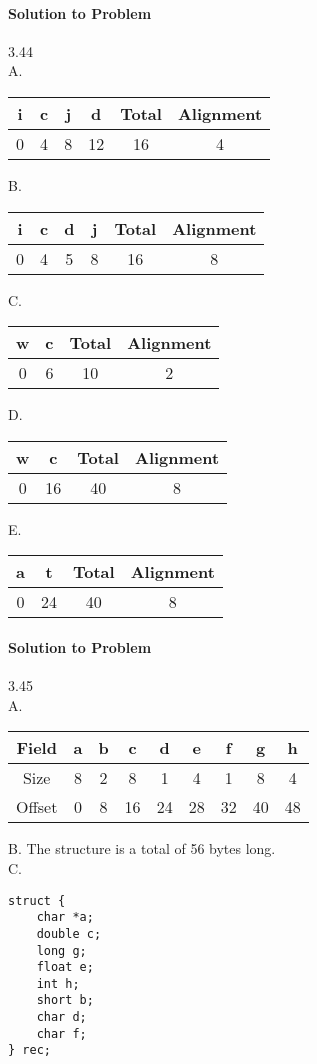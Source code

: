 \documentclass{report}
\begin{document}
\paragraph{Solution to Problem } 3.44\\
A. 
\begin{center}
\begin{tabular}{ |c|c|c|c|c|c| } 
\hline
i & c & j & d & Total & Alignment \\ \hline
0 & 4 & 8 & 12 & 16 & 4 \\
\hline
\end{tabular}
\end{center}
B. 
\begin{center}
\begin{tabular}{ |c|c|c|c|c|c| } 
\hline
i & c & d & j & Total & Alignment \\ \hline
0 & 4 & 5 & 8 & 16 & 8 \\
\hline
\end{tabular}
\end{center}
C.
\begin{center}
\begin{tabular}{ |c|c|c|c| } 
\hline
w & c & Total & Alignment \\ \hline
0 & 6 & 10 & 2  \\
\hline
\end{tabular}
\end{center}
D.
\begin{center}
\begin{tabular}{ |c|c|c|c| } 
\hline
w & c & Total & Alignment \\ \hline
0 & 16 & 40 & 8  \\
\hline
\end{tabular}
\end{center}
E.
\begin{center}
\begin{tabular}{ |c|c|c|c| } 
\hline
a & t & Total & Alignment \\ \hline
0 & 24 & 40 & 8  \\
\hline
\end{tabular}
\end{center}

\paragraph{Solution to Problem } 3.45\\
A. 
\begin{center}
\begin{tabular}{ |c|c|c|c|c|c|c|c|c| } 
\hline
Field & a & b & c & d & e & f & g & h \\ \hline
Size & 8 & 2 & 8 & 1 & 4 & 1 & 8 & 4 \\
Offset & 0 & 8 & 16 & 24 & 28 & 32 & 40 & 48 \\ 
\hline
\end{tabular}
\end{center}
B. The structure is a total of 56 bytes long. \\
C. 
\begin{lstlisting}
struct {
    char *a;
    double c;
    long g;
    float e;
    int h;
    short b;
    char d;
    char f;
} rec;
\end{lstlisting}
\end{document}
